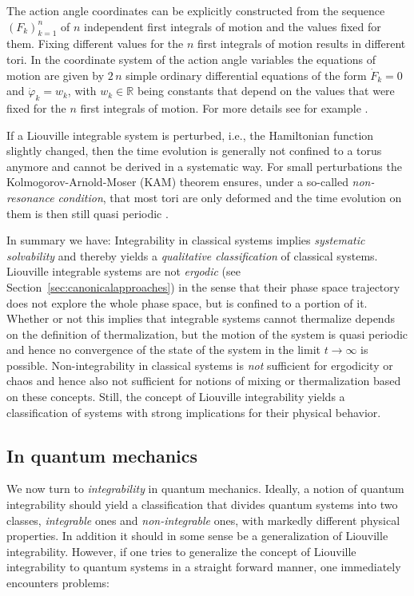 \documentclass[a4paper,12pt,listof=totoc,index=totoc,bibliography=totoc,headsepline=false,headings=normal,BCOR16.153846mm,DIV12,headinclude,twoside,cleardoublepage=empty,numbers=noenddot,final]{scrreprt}
\theoremstyle{mystyle}
\numberwithin{equation}{section}
\numberwithin{figure}{section}
\numberwithin{lemma}{section}
\numberwithin{theorem}{section}
\numberwithin{corollary}{section}
\numberwithin{definition}{section}
\numberwithin{conjecture}{section}
\numberwithin{observation}{section}
\newcommand{\+}{\mkern2mu}
\DeclareMathOperator{\1}{\mathds{1}}
\newcommand{\mb}[1]{\mathbb{#1}}
\newcommand{\R}{\mb{R}}
\begin{document}
The action angle coordinates can be explicitly constructed from the sequence $(F_k)_{k=1}^{n}$ of $n$ independent first integrals of motion and the values fixed for them.
Fixing different values for the $n$ first integrals of motion results in different tori.
In the coordinate system of the action angle variables the equations of motion are given by $2\,n$ simple ordinary differential equations of the form $\dot F_k = 0$ and $\dot \varphi_k = w_k$, with $w_k \in \R$ being constants that depend on the values that were fixed for the $n$ first integrals of motion.
For more details see for example \cite[Section 49]{Arnold78}.

If a Liouville integrable system is perturbed, i.e., the Hamiltonian function slightly changed, then the time evolution is generally not confined to a torus anymore and cannot be derived in a systematic way.
For small perturbations the Kolmogorov-Arnold-Moser (KAM) theorem ensures, under a so-called \emph{non-resonance condition}, that most tori are only deformed and the time evolution on them is then still quasi periodic \cite{Moradi2001,Tabor1989,Poeschel03}.

In summary we have:
Integrability in classical systems implies \emph{systematic solvability} and thereby yields a \emph{qualitative classification} of classical systems.
Liouville integrable systems are not \emph{ergodic} (see Section~\ref{sec:canonicalapproaches}) in the sense that their phase space trajectory does not explore the whole phase space, but is confined to a portion of it.
Whether or not this implies that integrable systems cannot thermalize depends on the definition of thermalization, but the motion of the system is quasi periodic and hence no convergence of the state of the system in the limit $t\to\infty$ is possible.
Non-integrability in classical systems is \emph{not} sufficient for ergodicity or chaos and hence also not sufficient for notions of mixing or thermalization based on these concepts.
Still, the concept of Liouville integrability yields a classification of systems with strong implications for their physical behavior.


\subsection{In quantum mechanics}
\label{sec:integrabilityinquantumtheory}
%
We now turn to \emph{integrability} in quantum mechanics.
Ideally, a notion of quantum integrability should yield a classification that divides quantum systems into two classes, \emph{integrable} ones and \emph{non-integrable} ones, with markedly different physical properties.
In addition it should in some sense be a generalization of Liouville integrability.
However, if one tries to generalize the concept of Liouville integrability to quantum systems in a straight forward manner, one immediately encounters problems:
\end{document}

